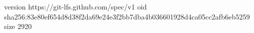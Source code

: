 version https://git-lfs.github.com/spec/v1
oid sha256:83e80ef654d8d38f2da69e24e3f2bb7dba4b036601928d4ca05cc2afb6eb5259
size 2920
